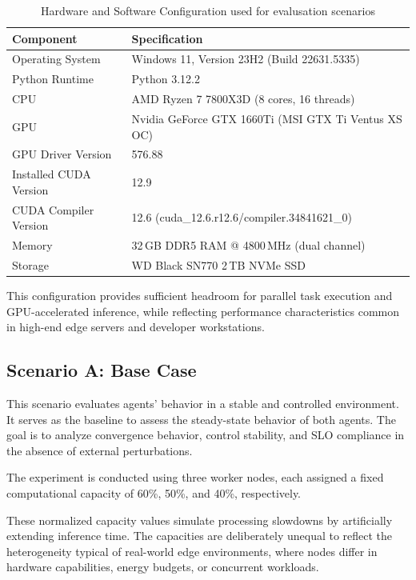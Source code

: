 \begin{table}[htbp]
\centering
\caption{Hardware and Software Configuration used for evalusation scenarios}
\label{tab:hardware-software}
\begin{tabular}{@{}ll@{}}
\toprule
\textbf{Component} & \textbf{Specification} \\
\midrule
Operating System & Windows 11, Version 23H2 (Build 22631.5335) \\
Python Runtime & Python 3.12.2 \\
CPU & AMD Ryzen 7 7800X3D (8 cores, 16 threads) \\
GPU & Nvidia GeForce GTX 1660Ti (MSI GTX Ti Ventus XS OC) \\
GPU Driver Version & 576.88 \\
Installed CUDA Version & 12.9 \\
CUDA Compiler Version & 12.6 (cuda\_12.6.r12.6/compiler.34841621\_0) \\
Memory & 32\,GB DDR5 RAM @ 4800\,MHz (dual channel) \\
Storage & WD Black SN770 2\,TB NVMe SSD \\
\bottomrule
\end{tabular}
\end{table}


This configuration provides sufficient headroom for parallel task execution and GPU-accelerated inference, while reflecting performance characteristics common in high-end edge servers and developer workstations.

\subsection{Scenario A: Base Case}
\label{sec:evaluation-base}

This scenario evaluates agents' behavior in a stable and controlled environment. It serves as the baseline to assess the steady-state behavior of both agents. The goal is to analyze convergence behavior, control stability, and SLO compliance in the absence of external perturbations.

The experiment is conducted using three worker nodes, each assigned a fixed computational capacity of 60\%, 50\%, and 40\%, respectively.

These normalized capacity values simulate processing slowdowns by artificially extending inference time. The capacities are deliberately unequal to reflect the heterogeneity typical of real-world edge environments, where nodes differ in hardware capabilities, energy budgets, or concurrent workloads.

